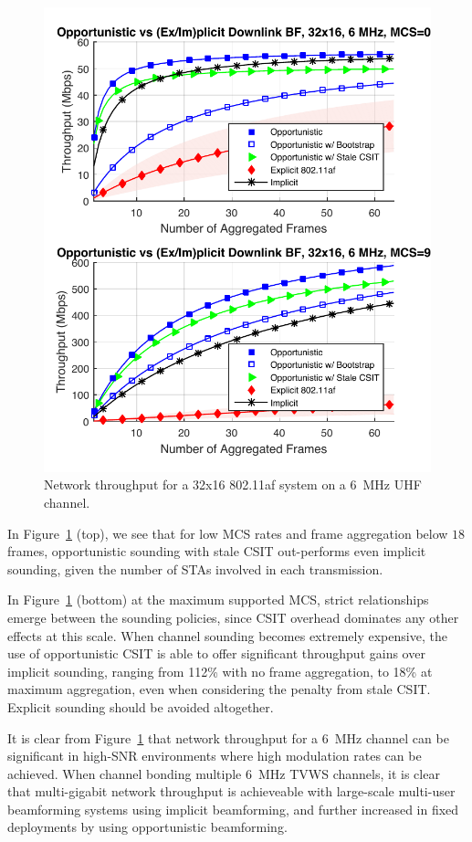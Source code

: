 	\begin{figure}[th!] %
\centering
\includegraphics[width=0.7\linewidth]{./figs/protocol/tput_vs_agg_32x16_6mhz_im_mcs-0_crop}
\caption{Network throughput for a 32x16 802.11af system on a 6~MHz UHF channel.}
\label{fig:protosim_32x16}
\end{figure}

	In Figure~\ref{fig:protosim_32x16} (top), we see that for low \ac{MCS} rates and frame aggregation below $18$ frames, opportunistic sounding with stale \ac{CSIT} out-performs even implicit sounding, given the number of \acp{STA} involved in each transmission.
	
	In Figure~\ref{fig:protosim_32x16} (bottom) at the maximum supported \ac{MCS}, strict relationships emerge between the sounding policies, since \ac{CSIT} overhead dominates any other effects at this scale.
	When channel sounding becomes extremely expensive, the use of opportunistic \ac{CSIT} is able to offer significant throughput gains over implicit sounding, ranging from 112\% with no frame aggregation, to 18\% at maximum aggregation, even when considering the penalty from stale \ac{CSIT}.
	Explicit sounding should be avoided altogether.

	It is clear from Figure~\ref{fig:protosim_32x16} that network throughput for a 6~MHz channel can be significant in high-\ac{SNR} environments where high modulation rates can be achieved.
	When channel bonding multiple 6~MHz \ac{TVWS} channels, it is clear that multi-gigabit network throughput is achieveable with large-scale multi-user beamforming systems using implicit beamforming, and further increased in fixed deployments by using opportunistic beamforming.

